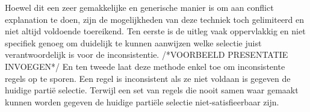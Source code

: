 Hoewel dit een zeer gemakkelijke en generische manier is om aan conflict explanation te doen, zijn de mogelijkheden van deze techniek toch gelimiteerd en niet altijd voldoende toereikend. Ten eerste is de uitleg vaak oppervlakkig en niet specifiek genoeg om duidelijk te kunnen aanwijzen welke selectie juist verantwoordelijk is voor de inconsistentie. /*VOORBEELD PRESENTATIE INVOEGEN*/ En ten tweede laat deze methode enkel toe om inconsistente regels op te sporen. Een regel is inconsistent als ze niet voldaan is gegeven de huidige parti\"{e} selectie. Terwijl een set van regels die nooit samen waar gemaakt kunnen worden gegeven de huidige parti\"{e}le selectie niet-satisfieerbaar zijn. 


